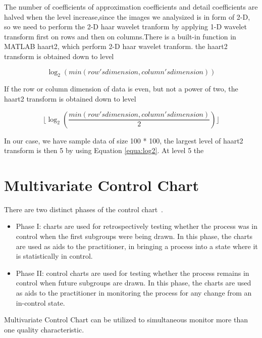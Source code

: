 The number of coefficients of approximation coefficients and detail coefficients are halved when the level increase,since the images we analysized is in form of 2-D, so we need to perform the 2-D haar wavelet tranform by applying 1-D wavelet transform first on rows and then on columns.There is a built-in function in MATLAB haart2, which perform 2-D haar wavelet tranform.
the haart2 transform is obtained down to level

\begin{equation}
\log_2(min(row's dimension,column's dimension)) \label{equa:log1}
\end{equation}

If the row or column dimension of data is even, but not a power of two, the haart2 transform is obtained down to level 

\begin{equation}
\lfloor \log_2(\frac{min(row's dimension,column's dimension)}{2}) \rfloor \label{equa:log2}
\end{equation}

In our case, we have sample data of size 100 * 100, the largest level of haart2 transform is then 5 by using Equation \ref{equa:log2}. At level 5 the 






\section{Multivariate Control Chart}
There are two distinct phases of the control chart~\cite{bersimis2007multivariate}.

\begin{itemize}
\item Phase I: charts are used for retrospectively testing whether the process was in control when the first
subgroups were being drawn. In this phase, the charts are used as aids to the practitioner, in bringing a
process into a state where it is statistically in control.
\item Phase II: control charts are used for testing whether the process remains in control when future subgroups
are drawn. In this phase, the charts are used as aids to the practitioner in monitoring the process for any
change from an in-control state.
\end{itemize}

Multivariate Control Chart can be utilized to simultaneous monitor more than one quality characteristic.




